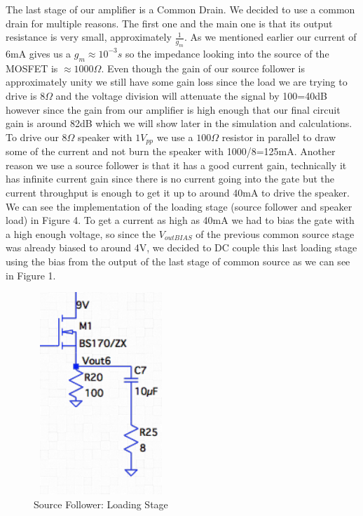 \documentclass[11pt, twoside, letterpaper]{article}
\begin{document}
The last stage of our amplifier is a Common Drain. We decided to use a common drain for multiple reasons. The first one and the main one
is that its output resistance is very small, approximately $\frac{1}{g_m}$. As we mentioned earlier our current of 6mA gives us a $g_m\approx10^{-3}s$
so the impedance looking into the source of the MOSFET is $\approx 1000\Omega$. Even though the gain of our source follower is approximately unity we
still have some gain loss since the load we are trying to drive is $8\Omega$ and the voltage division will attenuate the signal by 100=40dB however 
since the gain from our amplifier is high enough that our final circuit gain is around 82dB which we will show later in the simulation and calculations. 
To drive our $8\Omega$ speaker with $1V_{pp}$ we use a $100\Omega$ resistor in parallel to draw some of the current and not burn the speaker with 
1000/8=125mA. Another reason we use a source follower is that it has a good current gain, technically it has infinite current gain since there is no
current going into the gate but the current throughput is enough to get it up to around 40mA to drive the speaker. We can see the implementation of the
loading stage (source follower and speaker load) in Figure 4. To get a current as high as 40mA we had to bias the gate with a high enough voltage, so
since the $V_{outBIAS}$ of the previous common source stage was already biased to around 4V, we decided to DC couple this last loading stage using 
the bias from the output of the last stage of common source as we can see in Figure 1.

\begin{figure}[htbp]
\begin{center}
\includegraphics[width=2in,height=3in]{SourceFollower.png}
\caption{Source Follower: Loading Stage}
\end{center}
\end{figure}
\FloatBarrier
\end{document}
